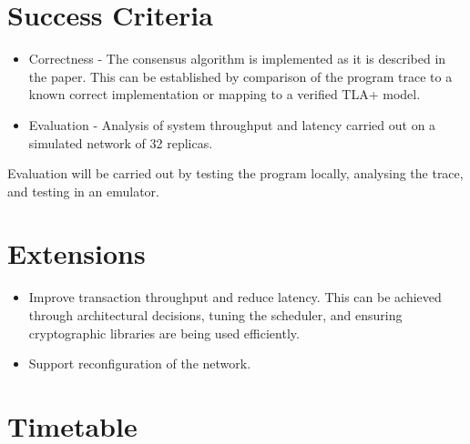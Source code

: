 \documentclass[../main]{subfiles}
\begin{document}
\section*{Success Criteria}
\begin{itemize}
	\item Correctness - The consensus algorithm is implemented as it is described in the paper. This can be established by comparison of the program trace to a known correct implementation or mapping to a verified TLA+ model.
	\item Evaluation - Analysis of system throughput and latency carried out on a simulated network of 32 replicas.
\end{itemize}
Evaluation will be carried out by testing the program locally, analysing the trace, and testing in an emulator.

\section*{Extensions}
\begin{itemize}
	\item Improve transaction throughput and reduce latency. This can be achieved through architectural decisions, tuning the scheduler, and ensuring cryptographic libraries are being used efficiently.
	\item Support reconfiguration of the network.
\end{itemize}

\section*{Timetable}
\end{document}
